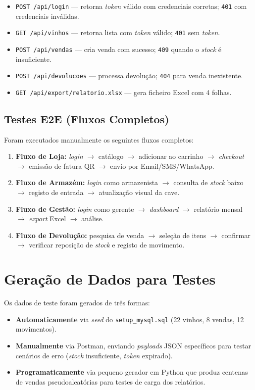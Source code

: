 \documentclass[11pt,a4paper]{report}
\begin{document}
\begin{itemize}
  \item \texttt{POST /api/login} --- retorna \textit{token} válido com credenciais corretas; \texttt{401} com credenciais inválidas.
  \item \texttt{GET /api/vinhos} --- retorna lista com \textit{token} válido; \texttt{401} sem \textit{token}.
  \item \texttt{POST /api/vendas} --- cria venda com sucesso; \texttt{409} quando o \textit{stock} é insuficiente.
  \item \texttt{POST /api/devolucoes} --- processa devolução; \texttt{404} para venda inexistente.
  \item \texttt{GET /api/export/relatorio.xlsx} --- gera ficheiro Excel com 4 folhas.
\end{itemize}

\subsection{Testes E2E (Fluxos Completos)}
Foram executados manualmente os seguintes fluxos completos:

\begin{enumerate}
  \item \textbf{Fluxo de Loja:} \textit{login} $\to$ catálogo $\to$ adicionar ao carrinho $\to$ \textit{checkout} $\to$ emissão de fatura QR $\to$ envio por Email/SMS/WhatsApp.
  \item \textbf{Fluxo de Armazém:} \textit{login} como armazenista $\to$ consulta de \textit{stock} baixo $\to$ registo de entrada $\to$ atualização visual da cave.
  \item \textbf{Fluxo de Gestão:} \textit{login} como gerente $\to$ \textit{dashboard} $\to$ relatório mensal $\to$ \textit{export} Excel $\to$ análise.
  \item \textbf{Fluxo de Devolução:} pesquisa de venda $\to$ seleção de itens $\to$ confirmar $\to$ verificar reposição de \textit{stock} e registo de movimento.
\end{enumerate}

\section{Geração de Dados para Testes}
Os dados de teste foram gerados de três formas:

\begin{itemize}
  \item \textbf{Automaticamente} via \textit{seed} do \texttt{setup\_mysql.sql} (22 vinhos, 8 vendas, 12 movimentos).
  \item \textbf{Manualmente} via Postman, enviando \textit{payloads} JSON específicos para testar cenários de erro (\textit{stock} insuficiente, \textit{token} expirado).
  \item \textbf{Programaticamente} via pequeno gerador em Python que produz centenas de vendas pseudoaleatórias para testes de carga dos relatórios.
\end{itemize}
\end{document}
